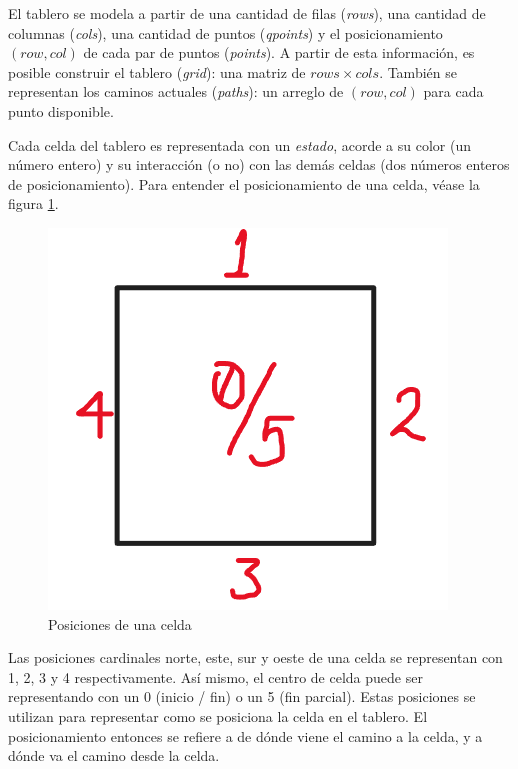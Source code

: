 \documentclass[letter,12pt]{article}
\begin{document}
El tablero se modela a partir de una cantidad de filas (\textit{rows}), una cantidad de columnas (\textit{cols}), una cantidad de puntos (\textit{qpoints}) y el posicionamiento $(row, col)$ de cada par de puntos (\textit{points}). A partir de esta información, es posible construir el tablero (\textit{grid}): una matriz de $rows \times cols$. También se representan los caminos actuales (\textit{paths}): un arreglo de $(row, col)$ para cada punto disponible. \par

Cada celda del tablero es representada con un \textit{estado}, acorde a su color (un número entero) y su interacción (o no) con las demás celdas (dos números enteros de posicionamiento). Para entender el posicionamiento de una celda, véase la figura \ref{fig:posiciones_celda}. \par

\begin{figure}[ht!]
	\centering
	\includegraphics[scale=0.3]{img/cell_positions.png}
	\caption{Posiciones de una celda}
	\label{fig:posiciones_celda}
\end{figure}

Las posiciones cardinales norte, este, sur y oeste de una celda se representan con 1, 2, 3 y 4 respectivamente. Así mismo, el centro de celda puede ser representando con un 0 (inicio / fin) o un 5 (fin parcial). Estas posiciones se utilizan para representar como se posiciona la celda en el tablero. El posicionamiento entonces se refiere a de dónde viene el camino a la celda, y a dónde va el camino desde la celda. \par
\end{document}
